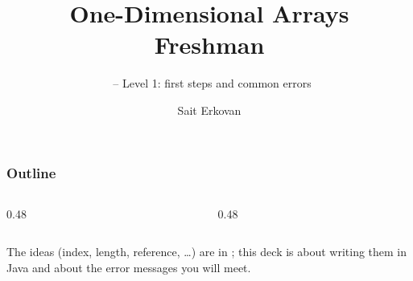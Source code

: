 \documentclass[aspectratio=169,10pt,compress]{beamer}
\title[Arrays 1D: Freshman]{
	One-Dimensional Arrays\\
	Freshman
}
\subtitle{
	\cisOOO\ -- Level 1: first steps and common errors
}
\author[Erkovan]{Sait Erkovan}
\institute[FCIS]{
	Faculty of Computer and Information Sciences\\
	Yeditepe University
}
\date{{\tiny \hbTimeStamp}}
\begin{document}
\begin{frame}[t,fragile]
	\titlepage
\end{frame}




\begin{frame}[t,fragile] \frametitle{Outline}
	\begin{columns}[T]
		\begin{column}{0.48\textwidth}
			\tableofcontents[sections={1-3}, hideallsubsections]
		\end{column}
		\begin{column}{0.48\textwidth}
			\tableofcontents[sections={4-6}, hideallsubsections]
		\end{column}
	\end{columns}

	\vspace{1em}
	\small The ideas (index, length, reference, \dots) are in ;
	this deck is about writing them in Java and about the error messages you will meet.
\end{frame}




\end{document}
